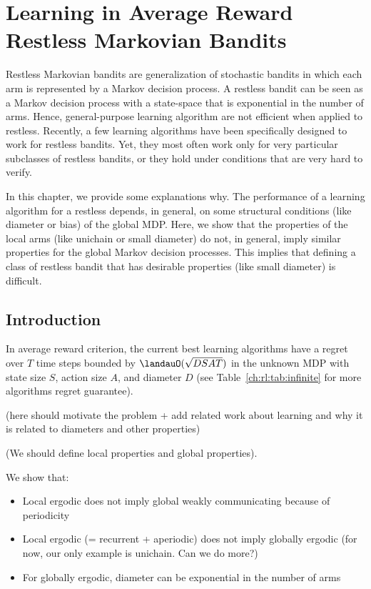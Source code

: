 \begingroup
\let\clearpage\relax

\chapter{Learning in Average Reward Restless Markovian Bandits}
\label{ch:learning_restless}


Restless Markovian bandits are generalization of stochastic bandits in which each arm is represented by a Markov decision process. A restless bandit can be seen as a Markov decision process with a state-space that is exponential in the number of arms. Hence, general-purpose learning algorithm are not efficient when applied to restless. Recently, a few learning algorithms have been specifically designed to work for restless bandits. Yet, they most often work only for very particular subclasses of restless bandits, or they hold under conditions that are very hard to verify.

In this chapter, we provide some explanations why. The performance of a learning algorithm for a restless depends, in general, on some structural conditions (like diameter or bias) of the global MDP.  Here, we show that the properties of the local arms (like unichain or small diameter) do not, in general, imply similar properties for the global Markov decision processes. This implies that defining a class of restless bandit that has desirable properties (like small diameter) is difficult. 

\section{Introduction}

In average reward criterion, the current best learning algorithms have a regret over $T$ time steps bounded by $\landauO(\sqrt{DSAT})$ in the unknown MDP with state size $S$, action size $A$, and diameter $D$ (see Table~\ref{ch:rl:tab:infinite} for more algorithms regret guarantee).


(here should motivate the problem + add related work about learning and why it is related to diameters and other properties)

(We should define local properties and global properties).

We show that:
\begin{itemize}
    \item Local ergodic does not imply global weakly communicating because of periodicity 
    \item Local ergodic (= recurrent + aperiodic) does not imply globally ergodic (for now, our only example is unichain. Can we do more?)
    \item For globally ergodic, diameter can be exponential in the number of arms
\end{itemize}

